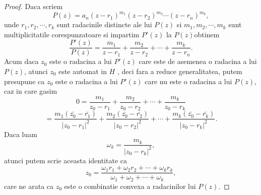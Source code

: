 \documentclass[a4paper,12pt,oneside]{report}
\begin{document}
\begin{proof}
Daca scriem
\begin{displaymath}
  P\left ( z \right ) = a_{n}\left ( z - r_{1} \right )^{m_{1}}\left ( z - r_{2} \right )^{m_{2}}\cdots \left ( z - r_{n} \right )^{m_{k}},
\end{displaymath}
unde  \(r_{1} , r_{2}, \cdots, r_{k}\) sunt radacinile distincte ale lui \(P\left ( z \right )\) si \(m_{1} , m_{2}, \cdots, m_{k}\) sunt multiplicitatile corespunzatoare si impartim \({P}'\left ( z \right )\) la \( P\left ( z \right )\)obtinem
\begin{displaymath}
  \frac{{P}'\left ( z \right ) }{P\left ( z \right )} = \frac{m_{1}}{z - r_{1}} + \frac{m_{2}}{z - r_{2}}+ \cdots + \frac{m_{k}}{z - r_{n}} .
\end{displaymath}
Acum daca \(z_{0}\) este o radacina a lui \({P}'\left ( z \right )\) care este de asemenea o radacina a lui \(P\left ( z \right )\), atunci \(z_{0}\) este automat in \(H\) , deci fara a reduce generalitatea, putem presupune ca \(z_{0}\)  este o radacina a lui  \({P}'\left ( z \right )\) care nu este o radacina a lui \(P\left ( z \right )\), caz in care gasim
\begin{displaymath}
  0 = \frac{m_{1}}{z_{0} - r_{1}} + \frac{m_{2}}{z_{0} - r_{2}} +\cdots+ \frac{m_{k}}{z_{0} - r_{k}}
\end{displaymath}
\begin{displaymath}
= \frac{m_{1}\left (\bar{z_{0}} - \bar{r_{1}}\right )}{\left | z_{0}  - r_{1}\right |^{2}} + \frac{m_{2}\left (\bar{z_{0}} - \bar{r_{2}}\right )}{\left | z_{0}  - r_{2}\right |^{2}} + \cdots+ \frac{m_{k}\left (\bar{z_{0}} - \bar{r_{k}}\right )}{\left | z_{0}  - r_{k}\right |^{2}}.
\end{displaymath}
Daca luam
\begin{displaymath}
  \omega _{k} =\frac{ m_{k}}{\left | z_{0}  - r_{k}\right |^{2}},
\end{displaymath} atunci putem scrie aceasta identitate ca
\begin{displaymath}
  z_{0} = \frac{\omega _{1}r_{1} +\omega _{2}r{_2}+\cdots+ \omega _{k}r{_k} }{\omega _{1} + \omega _{2} + \cdots + \omega _{k}},
\end{displaymath}
care ne arata ca \(z_{0}\) este o combinatie convexa a radacinilor lui \(P\left ( z \right )\).
\end{proof}
\end{document}
